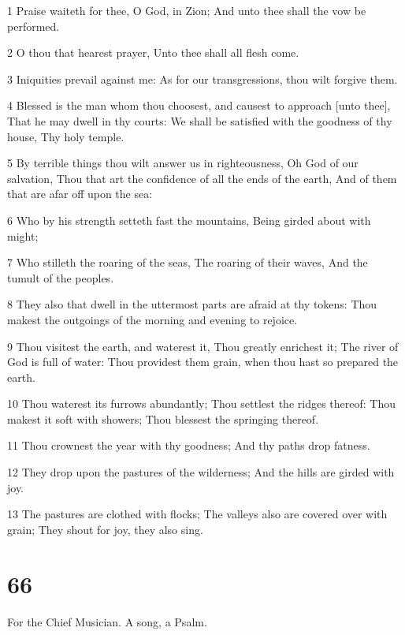 \par 1 Praise waiteth for thee, O God, in Zion; And unto thee shall the vow be performed.
\par 2 O thou that hearest prayer, Unto thee shall all flesh come.
\par 3 Iniquities prevail against me: As for our transgressions, thou wilt forgive them.
\par 4 Blessed is the man whom thou choosest, and causest to approach [unto thee], That he may dwell in thy courts: We shall be satisfied with the goodness of thy house, Thy holy temple.
\par 5 By terrible things thou wilt answer us in righteousness, Oh God of our salvation, Thou that art the confidence of all the ends of the earth, And of them that are afar off upon the sea:
\par 6 Who by his strength setteth fast the mountains, Being girded about with might;
\par 7 Who stilleth the roaring of the seas, The roaring of their waves, And the tumult of the peoples.
\par 8 They also that dwell in the uttermost parts are afraid at thy tokens: Thou makest the outgoings of the morning and evening to rejoice.
\par 9 Thou visitest the earth, and waterest it, Thou greatly enrichest it; The river of God is full of water: Thou providest them grain, when thou hast so prepared the earth.
\par 10 Thou waterest its furrows abundantly; Thou settlest the ridges thereof: Thou makest it soft with showers; Thou blessest the springing thereof.
\par 11 Thou crownest the year with thy goodness; And thy paths drop fatness.
\par 12 They drop upon the pastures of the wilderness; And the hills are girded with joy.
\par 13 The pastures are clothed with flocks; The valleys also are covered over with grain; They shout for joy, they also sing.

\chapter{66}

\par For the Chief Musician. A song, a Psalm.


